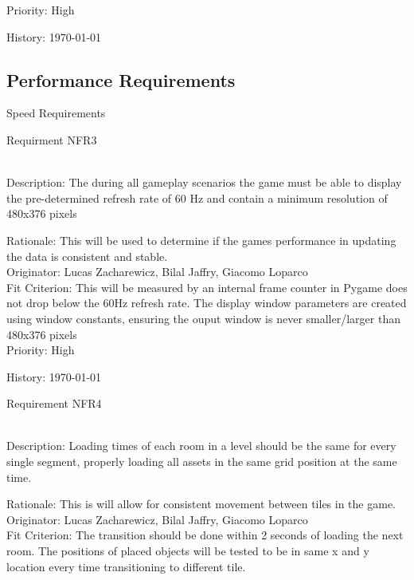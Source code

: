 \documentclass[12pt, titlepage]{article}
\begin{document}
\begin{enumerate}
{\color{blue}Priority: High}

{\color{blue}History: \today}
\subsection{Performance Requirements}

Speed Requirements

{\color{blue}\item Requirment NFR3} \\
{\color{blue} Description:} The during all gameplay scenarios the game must be able to display the pre-determined refresh rate of 60 Hz and contain a minimum resolution of {\color{blue}480x376 pixels}

{\color{blue}Rationale: This will be used to determine if the games performance in updating the data is consistent and stable.}\\

{\color{blue}Originator: Lucas Zacharewicz, Bilal Jaffry, Giacomo Loparco}\\


{\color{blue}Fit Criterion: This will be measured by an internal frame counter in Pygame does not drop below the 60Hz refresh rate. The display window parameters are created using window constants, ensuring  the ouput window is never smaller/larger than {\color{blue}480x376 pixels} }\\
 
{\color{blue}Priority: High}
  
{\color{blue}History: \today}
  


{\color{blue}\item Requirement NFR4}\\
{\color{blue} Description:} Loading times of each room in a level should be the same for every single segment, properly loading all assets in the same grid position at the same time.

{\color{blue}Rationale: This is will allow for consistent movement between tiles in the game.}\\

{\color{blue}Originator: Lucas Zacharewicz, Bilal Jaffry, Giacomo Loparco}\\

{\color{blue}Fit Criterion: The transition should be done within 2 seconds of loading the next room. The positions of placed objects will be tested to be in same x and y location every time transitioning to different tile.}\\
 

\end{enumerate}
\end{document}
